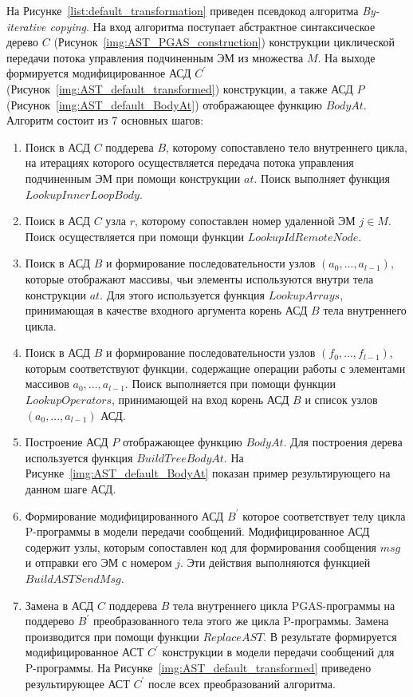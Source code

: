 На Рисунке~\ref{list:default_transformation} приведен псевдокод алгоритма \textit{By-iterative copying}. На вход алгоритма поступает абстрактное синтаксическое дерево $C$ (Рисунок~\ref{img:AST_PGAS_construction}) конструкции циклической передачи потока управления подчиненным ЭМ из множества $M$. На выходе формируется модифицированное АСД $C^{\prime}$ (Рисунок~\ref{img:AST_default_transformed}) конструкции, а также АСД $P$ (Рисунок~\ref{img:AST_default_BodyAt}) отображающее функцию $BodyAt$. Алгоритм состоит из 7 основных шагов:
\begin{enumerate}
\item Поиск в АСД $C$ поддерева $B$, которому сопоставлено тело внутреннего цикла, на итерациях которого осуществляется передача потока управления подчиненным ЭМ при помощи конструкции $at$. Поиск выполняет функция $LookupInnerLoopBody$.
\item Поиск в АСД $C$ узла $r$, которому сопоставлен номер удаленной ЭМ $j \in M$. Поиск осуществляется при помощи функции $LookupIdRemoteNode$.
\item Поиск в АСД $B$ и формирование последовательности узлов $(a_{0},...,a_{l-1})$, которые отображают массивы, чьи элементы используются внутри тела конструкции $at$. Для этого используется функция $LookupArrays$, принимающая в качестве входного аргумента корень АСД $B$ тела внутреннего цикла.
\item Поиск в АСД $B$ и формирование последовательности узлов $(f_{0},...,f_{l-1})$, которым соответствуют функции, содержащие операции работы с элементами массивов $a_{0},...,a_{l-1}$. Поиск выполняется при помощи функции $LookupOperators$, принимающей на вход корень АСД $B$ и список узлов $(a_{0},...,a_{l-1})$ АСД.
\item Построение АСД $P$ отображающее функцию $BodyAt$. Для построения дерева используется функция $BuildTreeBodyAt$. На Рисунке~\ref{img:AST_default_BodyAt} показан пример результирующего на данном шаге АСД.
\item Формирование модифицированного АСД $B^{\prime}$ которое соответствует телу цикла P-программы в модели передачи сообщений. Модифицированное АСД содержит узлы, которым сопоставлен код для формирования сообщения $msg$ и отправки его ЭМ с номером $j$. Эти действия выполняются функцией $BuildASTSendMsg$.
\item Замена в АСД $C$ поддерева $B$ тела внутреннего цикла PGAS-программы на поддерево $B^{\prime}$ преобразованного тела этого же цикла P-программы. Замена производится при помощи функции $ReplaceAST$. В результате формируется модифицированное АСТ $C^{\prime}$ конструкции в модели передачи сообщений для P-программы. На Рисунке~\ref{img:AST_default_transformed} приведено результирующее АСТ $C^{\prime}$ после всех преобразований алгоритма.
\end{enumerate}


